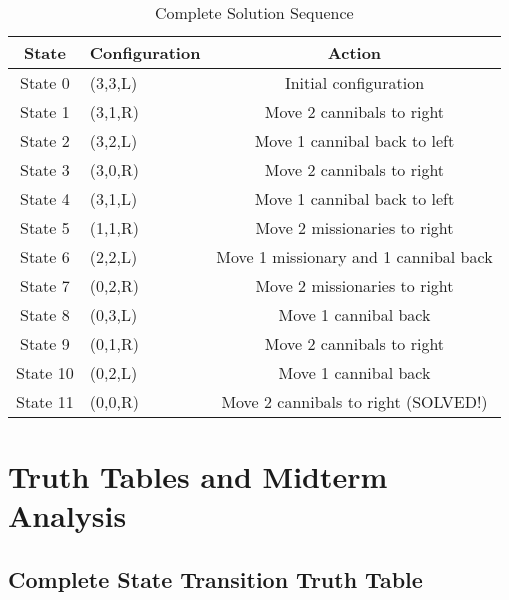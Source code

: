 \documentclass[12pt,letterpaper]{article}
\begin{document}
\begin{table}[H]
\centering
\caption{Complete Solution Sequence}
\begin{tabular}{@{}clc@{}}
\toprule
\textbf{State} & \textbf{Configuration} & \textbf{Action} \\
\midrule
State 0 & (3,3,L) & Initial configuration \\
State 1 & (3,1,R) & Move 2 cannibals to right \\
State 2 & (3,2,L) & Move 1 cannibal back to left \\
State 3 & (3,0,R) & Move 2 cannibals to right \\
State 4 & (3,1,L) & Move 1 cannibal back to left \\
State 5 & (1,1,R) & Move 2 missionaries to right \\
State 6 & (2,2,L) & Move 1 missionary and 1 cannibal back \\
State 7 & (0,2,R) & Move 2 missionaries to right \\
State 8 & (0,3,L) & Move 1 cannibal back \\
State 9 & (0,1,R) & Move 2 cannibals to right \\
State 10 & (0,2,L) & Move 1 cannibal back \\
State 11 & (0,0,R) & Move 2 cannibals to right (SOLVED!) \\
\bottomrule
\end{tabular}
\label{tab:solution}
\end{table}

\newpage

\section{Truth Tables and Midterm Analysis}

\subsection{Complete State Transition Truth Table}
\end{document}
